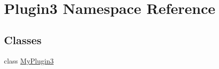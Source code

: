\hypertarget{namespace_plugin3}{\section{Plugin3 Namespace Reference}
\label{namespace_plugin3}
}
\subsection*{Classes}
\begin{DoxyCompactItemize}
\item 
class \hyperlink{class_plugin3_1_1_my_plugin3}{My\-Plugin3}
\end{DoxyCompactItemize}
